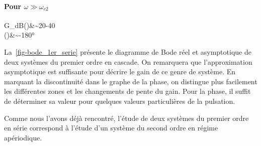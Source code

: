 \paragraph{Pour $\omega\gg\omega_{c2}$}
\begin{bequation}
    G_{dB}(\omega)&\sim20-40\\
    \phi(\omega)&\sim-180\si{\degree}
\end{bequation}

La~\cref{fig-bode_1er_serie} présente le diagramme de Bode réel et asymptotique 
de deux systèmes du premier ordre en cascade. On remarquera que l'approximation asymptotique est suffisante 
pour décrire le gain de ce genre de système. En marquant la discontinuité dans le graphe de la phase, 
on distingue plus facilement les différentes zones et les changements de pente du gain. Pour la phase, il suffit de déterminer
sa valeur pour quelques valeurs particulières de la pulsation. 

Comme nous l'avons déjà rencontré, l'étude de deux systèmes du premier ordre en série correspond à l'étude d'un système
du second ordre en régime apériodique.


